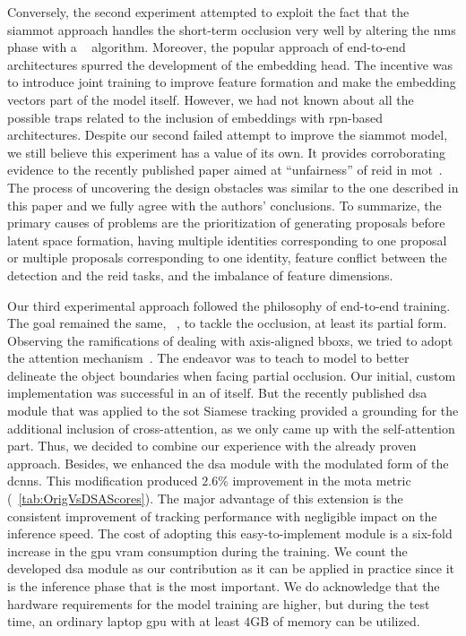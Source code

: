 Conversely, the second experiment attempted to exploit the fact that the \gls{siammot} approach handles the short-term occlusion very well by altering the \gls{nms} phase with a \featurenms{}~\cite{salscheider2020featurenms} algorithm. Moreover, the popular approach of end-to-end architectures spurred the development of the embedding head. The incentive was to introduce joint training to improve feature formation and make the embedding vectors part of the model itself. However, we had not known about all the possible traps related to the inclusion of embeddings with \gls{rpn}-based architectures. Despite our second failed attempt to improve the \gls{siammot} model, we still believe this experiment has a value of its own. It provides corroborating evidence to the recently published paper aimed at ``unfairness'' of \gls{reid} in \gls{mot}~\cite{zhang2021fairmot}. The process of uncovering the design obstacles was similar to the one described in this paper and we fully agree with the authors' conclusions. To summarize, the primary causes of problems are the prioritization of generating proposals before latent space formation, having multiple identities corresponding to one proposal or multiple proposals corresponding to one identity, feature conflict between the detection and the \gls{reid} tasks, and the imbalance of feature dimensions.

Our third experimental approach followed the philosophy of end-to-end training. The goal remained the same, \ietext{}~, to tackle the occlusion, at least its partial form. Observing the ramifications of dealing with axis-aligned \glspl{bbox}, we tried to adopt the attention mechanism~\cite{vaswani2017attention}. The endeavor was to teach to model to better delineate the object boundaries when facing partial occlusion. Our initial, custom implementation was successful in an of itself. But the recently published \gls{dsa}~\cite{yu2021dsa} module that was applied to the \gls{sot} Siamese tracking provided a grounding for the additional inclusion of cross-attention, as we only came up with the self-attention part. Thus, we decided to combine our experience with the already proven approach. Besides, we enhanced the \gls{dsa} module with the modulated form of the \glspl{dcnn}. This modification produced $2.6$\% improvement in the \gls{mota} metric (\tabletext{}~\ref{tab:OrigVsDSAScores}). The major advantage of this extension is the consistent improvement of tracking performance with negligible impact on the inference speed. The cost of adopting this easy-to-implement module is a six-fold increase in the \gls{gpu} \gls{vram} consumption during the training. We count the developed \gls{dsa} module as our contribution as it can be applied in practice since it is the inference phase that is the most important. We do acknowledge that the hardware requirements for the model training are higher, but during the test time, an ordinary laptop \gls{gpu} with at least $4$GB of memory can be utilized.

